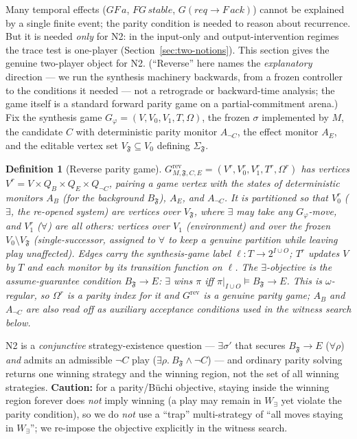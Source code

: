 \documentclass[11pt]{article}
\newtheorem{definition}{Definition}
\theoremstyle{remark}
\newcommand{\Frame}{\mathfrak{F}}
\begin{document}
Many temporal effects (\(GF\,a\), \(FG\,stable\), \(G(req\to F\,ack)\)) cannot be
explained by a single finite event; the parity condition is needed to reason about
recurrence. But it is needed \emph{only} for N2: in the input-only and
output-intervention regimes the trace test is one-player
(Section~\ref{sec:two-notions}). This section gives the genuine two-player object
for N2. (``Reverse'' here names the \emph{explanatory} direction --- we run the
synthesis machinery backwards, from a frozen controller to the conditions it
needed --- not a retrograde or backward-time analysis; the game itself is a
standard forward parity game on a partial-commitment arena.) Fix the synthesis game \(G_\varphi=(V,V_0,V_1,T,\Omega)\), the frozen
\(\sigma\) implemented by \(M\), the candidate \(C\) with deterministic parity
monitor \(A_{\neg C}\), the effect monitor \(A_E\), and the editable vertex set
\(V_{\Frame}\subseteq V_0\) defining \(\Sigma_{\Frame}\).

\begin{definition}[Reverse parity game]
\label{def:rpg}
\(G^{\mathrm{rev}}_{M,\Frame,C,E}=(V^r,V^r_0,V^r_1,T^r,\Omega^r)\) has vertices
\(V^r=V\times Q_B\times Q_E\times Q_{\neg C}\), pairing a game vertex with the
states of deterministic monitors \(A_B\) (for the background \(B_{\Frame}\)),
\(A_E\), and \(A_{\neg C}\). It is \emph{partitioned} so that \(V^r_0\)
(\(\exists\), the re-opened system) are vertices over \(V_{\Frame}\), where
\(\exists\) may take any \(G_\varphi\)-move, and \(V^r_1\) (\(\forall\)) are all
others: vertices over \(V_1\) (environment) and over the frozen
\(V_0\setminus V_{\Frame}\) (single-successor, assigned to \(\forall\) to keep a
genuine partition while leaving play unaffected). Edges carry the synthesis-game
label \(\ell:T\to 2^{I\cup O}\); \(T^r\) updates \(V\) by \(T\) and each monitor by
its transition function on \(\ell\). The \(\exists\)-objective is the
assume-guarantee condition \(B_{\Frame}\rightarrow E\): \(\exists\) wins \(\pi\)
iff \(\pi|_{I\cup O}\models B_{\Frame}\rightarrow E\). This is \(\omega\)-regular,
so \(\Omega^r\) is a parity index for it and \(G^{\mathrm{rev}}\) is a genuine
parity game; \(A_B\) and \(A_{\neg C}\) are also read off as \emph{auxiliary}
acceptance conditions used in the witness search below.
\end{definition}

N2 is a \emph{conjunctive} strategy-existence question --- \(\exists\sigma'\) that
secures \(B_{\Frame}\rightarrow E\) (\(\forall\rho\)) \emph{and} admits an
admissible \(\neg C\) play (\(\exists\rho.\ B_{\Frame}\wedge\neg C\)) --- and
ordinary parity solving returns one winning strategy and the winning region, not
the set of all winning strategies. \textbf{Caution:} for a parity/B\"uchi
objective, staying inside the winning region forever does \emph{not} imply winning
(a play may remain in \(W_\exists\) yet violate the parity condition), so we do
\emph{not} use a ``trap'' multi-strategy of ``all moves staying in \(W_\exists\)'';
we re-impose the objective explicitly in the witness search.
\end{document}
